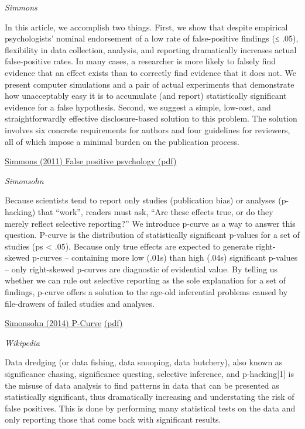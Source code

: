 \documentclass[
]{book}
\begin{document}
\emph{Simmons}

In this article, we accomplish two things. First, we show that despite empirical psychologists' nominal endorsement of a low rate
of false-positive findings (≤ .05), flexibility in data collection, analysis, and reporting dramatically increases actual false-positive
rates. In many cases, a researcher is more likely to falsely find evidence that an effect exists than to correctly find evidence
that it does not. We present computer simulations and a pair of actual experiments that demonstrate how unacceptably easy
it is to accumulate (and report) statistically significant evidence for a false hypothesis. Second, we suggest a simple, low-cost,
and straightforwardly effective disclosure-based solution to this problem. The solution involves six concrete requirements for
authors and four guidelines for reviewers, all of which impose a minimal burden on the publication process.

\href{pdf/Simmons_2011_False_Positive_Psychology.pdf}{Simmons (2011) False positive psychology (pdf)}

\emph{Simonsohn}

Because scientists tend to report only studies (publication bias) or analyses (p-hacking) that ``work'', readers must ask, ``Are these effects true, or do they merely reflect selective reporting?'' We introduce p-curve as a way to answer this question. P-curve is the distribution of statistically significant p-values for a set of studies (ps \textless{} .05). Because only true effects are expected to generate right-skewed p-curves -- containing more low (.01s) than high (.04s) significant p-values -- only right-skewed p-curves are diagnostic of evidential value. By telling us whether we can rule out selective reporting as the sole explanation for a set of findings, p-curve offers a solution to the age-old inferential problems caused by file-drawers of failed studies and analyses.

\href{https://papers.ssrn.com/sol3/papers.cfm?abstract_id=2256237}{Simonsohn (2014) P-Curve}
\href{pdf/Simonsohm_2014_P-curve.pdf}{(pdf)}

\emph{Wikipedia}

Data dredging (or data fishing, data snooping, data butchery), also known as significance chasing, significance questing, selective inference, and p-hacking{[}1{]} is the misuse of data analysis to find patterns in data that can be presented as statistically significant, thus dramatically increasing and understating the risk of false positives. This is done by performing many statistical tests on the data and only reporting those that come back with significant results.
\end{document}
